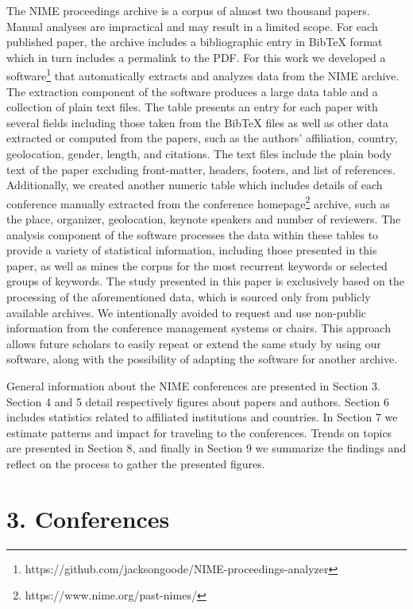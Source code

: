 \documentclass[sigconf]{nimeart}
\begin{document}
The NIME proceedings archive is a corpus of almost two thousand papers. Manual analyses are impractical and may result in a limited scope. For each published paper, the archive includes a bibliographic entry in BibTeX format which in turn includes a permalink to the PDF. For this work we developed a software\footnote{https://github.com/jacksongoode/NIME-proceedings-analyzer} that automatically extracts and analyzes data from the NIME archive. The extraction component of the software produces a large data table and a collection of plain text files. The table presents an entry for each paper with several fields including those taken from the BibTeX files as well as other data extracted or computed from the papers, such as the authors' affiliation, country, geolocation, gender, length, and citations. The text files include the plain body text of the paper excluding front-matter, headers, footers, and list of references. Additionally, we created another numeric table which includes details of each conference manually extracted from the conference homepage\footnote{https://www.nime.org/past-nimes/} archive, such as the place, organizer, geolocation, keynote speakers and number of reviewers. The analysis component of the software processes the data within these tables to provide a variety of statistical information, including those presented in this paper, as well as mines the corpus for the most recurrent keywords or selected groups of keywords. The study presented in this paper is exclusively based on the processing of the aforementioned data, which is sourced only from publicly available archives. We intentionally avoided to request and use non-public information from the conference management systems or chairs. This approach allows future scholars to easily repeat or extend the same study by using our software, along with the possibility of adapting the software for another archive.

General information about the NIME conferences are presented in Section 3. Section 4 and 5 detail respectively figures about papers and authors. Section 6 includes statistics related to affiliated institutions and countries. In Section 7 we estimate patterns and impact for traveling to the conferences. Trends on topics are presented in Section 8, and finally in Section 9 we summarize the findings and reflect on the process to gather the presented figures.

\section{3. Conferences}\label{conferences}
\end{document}
